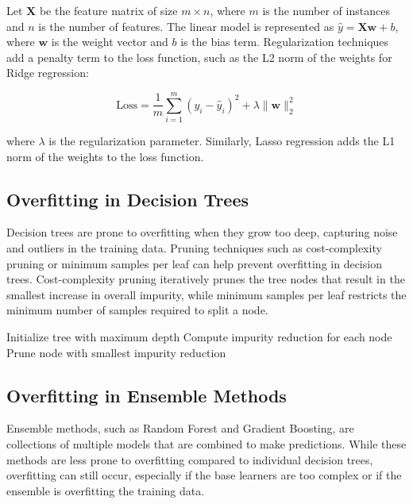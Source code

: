 \documentclass[12pt]{book} %
\begin{document}
Let \( \mathbf{X} \) be the feature matrix of size \( m \times n \), where \( m \) is the number of instances and \( n \) is the number of features. The linear model is represented as \( \hat{y} = \mathbf{X} \mathbf{w} + b \), where \( \mathbf{w} \) is the weight vector and \( b \) is the bias term. Regularization techniques add a penalty term to the loss function, such as the L2 norm of the weights for Ridge regression:

\[
\text{Loss} = \frac{1}{m} \sum_{i=1}^{m} (y_i - \hat{y}_i)^2 + \lambda \| \mathbf{w} \|_2^2
\]

where \( \lambda \) is the regularization parameter. Similarly, Lasso regression adds the L1 norm of the weights to the loss function.

\subsection{Overfitting in Decision Trees}

Decision trees are prone to overfitting when they grow too deep, capturing noise and outliers in the training data. Pruning techniques such as cost-complexity pruning or minimum samples per leaf can help prevent overfitting in decision trees. Cost-complexity pruning iteratively prunes the tree nodes that result in the smallest increase in overall impurity, while minimum samples per leaf restricts the minimum number of samples required to split a node.
\FloatBarrier
\begin{algorithm}
\caption{Cost-Complexity Pruning}
\begin{algorithmic}[1]
\State Initialize tree with maximum depth
    \State Compute impurity reduction for each node
    \State Prune node with smallest impurity reduction
\EndWhile
\end{algorithmic}
\end{algorithm}
\FloatBarrier

\subsection{Overfitting in Ensemble Methods}

Ensemble methods, such as Random Forest and Gradient Boosting, are collections of multiple models that are combined to make predictions. While these methods are less prone to overfitting compared to individual decision trees, overfitting can still occur, especially if the base learners are too complex or if the ensemble is overfitting the training data.
\end{document}
